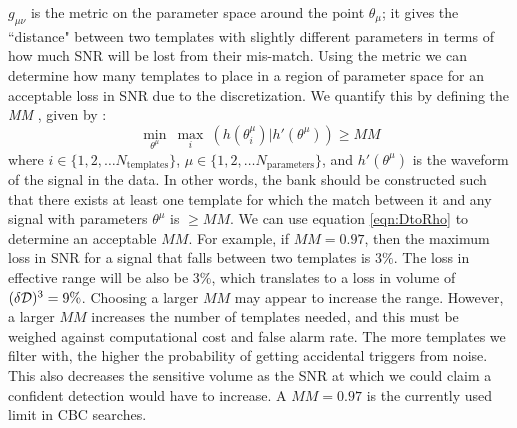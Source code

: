 $g_{\mu\nu}$ is the metric on the parameter space around the point $\theta_\mu$; it gives the ``distance" between two templates with slightly different parameters in terms of how much \ac{SNR} will be lost from their mis-match. Using the metric we can determine how many templates to place in a region of parameter space for an acceptable loss in \ac{SNR} due to the discretization. We quantify this by defining the \emph{\ac{MM}} \cite{Owen:1995tm}, given by \cite{hexabank}:
\begin{equation}
\label{eqn:min_match}
\underset{\theta^\mu}{\min}~\underset{i}{\max}~(h(\theta^{\mu}_{i})|h'(\theta^{\mu})) \geq MM
\end{equation}
where $i \in \{ 1, 2, \ldots N_{\mathrm{templates}} \}$, $\mu \in \{ 1, 2, \ldots N_{\mathrm{parameters}} \}$, and $h'(\theta^{\mu})$ is the waveform of the signal in the data. In other words, the bank should be constructed such that there exists at least one template for which the match between it and any signal with parameters $\theta^\mu$ is $\geq MM$. We can use equation \ref{eqn:DtoRho} to determine an acceptable $MM$. For example, if $MM = 0.97$, then the maximum loss in \ac{SNR} for a signal that falls between two templates is $3\%$. The loss in effective range will be also be $3\%$, which translates to a loss in volume of $(\delta \mathcal{D})^3 = 9\%$. Choosing a larger $MM$ may appear to increase the range. However, a larger $MM$ increases the number of templates needed, and this must be weighed against computational cost and false alarm rate. The more templates we filter with, the higher the probability of getting accidental triggers from noise. This also decreases the sensitive volume as the \ac{SNR} at which we could claim a confident detection would have to increase. A $MM = 0.97$ is the currently used limit in \ac{CBC} searches.

